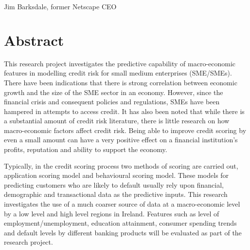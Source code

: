 \documentclass[11pt, oneside]{Thesis} %
\begin{document}
	\begin{flushright}
		Jim Barksdale, former Netscape CEO
	\end{flushright}
	
	\vfill\vfill\vfill\vfill\vfill\vfill\null %
	
	\clearpage %
	
	\begin{comment}

	\addtotoc{Abstract} %
	
	\abstract{\addtocontents{toc}{\vspace{1em}} 
		\textit{Small-medium enterprises (SMEs) play an important role in the economy 
			worldwide  and  they  normally  need  to  borrow  funds  from  financial 
			institutions.  Thus,  an  accurate  credit  risk  model  to  predict  the  probability 
			that  these  firms  might  be  bankrupt  and  cannot  pay  back  the  loans  on 
			time is very crucial.}
	\end{comment}
		
	\chapter*{\centering Abstract}
	This research project investigates the predictive capability of macro-economic features in modelling credit risk for small medium enterprises (SME/SMEs). There have been indications that there is strong correlation between economic growth and the size of the SME sector in an economy. However, since the financial crisis and consequent policies and regulations, SMEs have been hampered in attempts to access credit. It has also been noted that while there is a substantial amount of credit risk literature, there is little research on how macro-economic factors affect credit risk. Being able to improve credit scoring by even a small amount can have a very positive effect on a financial institution's profits, reputation and ability to support the economy.
	
	Typically, in the credit scoring process two methods of scoring are carried out, application scoring model and behavioural scoring model. These models for predicting customers who are likely to default usually rely upon financial, demographic and transactional data as the predictive inputs. This research investigates the use of a much coarser source of data at a macro-economic level by a low level and high level regions in Ireland. Features such as level of employment/unemployment, education attainment, consumer spending trends and default levels by different banking products will be evaluated as part of the research project.
	
\end{document}
